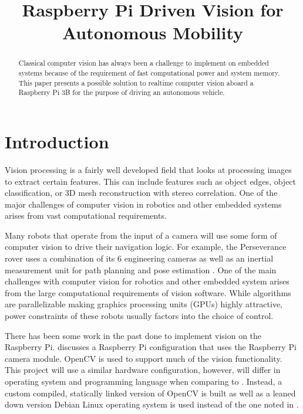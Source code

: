 \documentclass{article}
\title{Raspberry Pi Driven Vision for Autonomous Mobility}
\begin{document}
\maketitle

\begin{abstract}
Classical computer vision has always been a challenge to implement on embedded systems because of the requirement of fast computational power and system memory. This paper presents a possible solution to realtime computer vision aboard a Raspberry Pi 3B for the purpose of driving an autonomous vehicle.
\end{abstract}

\section{Introduction}

Vision processing is a fairly well developed field that looks at processing images to extract certain features. This can include features such as object edges, object classification, or 3D mesh reconstruction with stereo correlation. One of the major challenges of computer vision in robotics and other embedded systems arises from vast computational requirements.

Many robots that operate from the input of a camera will use some form of computer vision to drive their navigation logic. For example, the Perseverance rover uses a combination of its 6 engineering cameras as well as an inertial measurement unit for path planning and pose estimation \cite{b1}. One of the main challenges with computer vision for robotics and other embedded system arises from the large computational requirements of vision software. While algorithms are parallelizable making graphics processing units (GPUs) highly attractive, power constraints of these robots usually factors into the choice of control.

There has been some work in the past done to implement vision on the Raspberry Pi. \cite{b3} discusses a Raspberry Pi configuration that uses the Raspberry Pi camera module. OpenCV is used to support much of the vision functionality. This project will use a similar hardware configuration, however, will differ in operating system and programming language when comparing to \cite{b3}. Instead, a custom compiled, statically linked version of OpenCV is built as well as a leaned down version Debian Linux operating system is used instead of the one noted in \cite{b3}.
\end{document}
